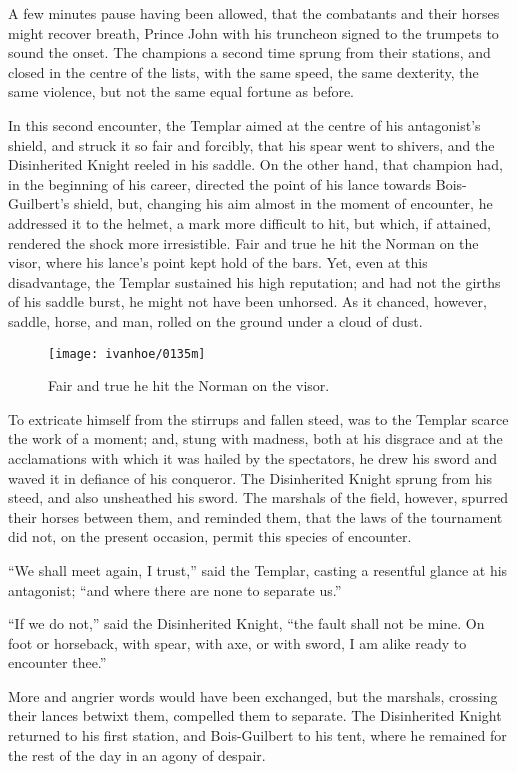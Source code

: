 A few minutes pause having been allowed, that the combatants and their
horses might recover breath, Prince John with his truncheon signed to
the trumpets to sound the onset. The champions a second time sprung from
their stations, and closed in the centre of the lists, with the same
speed, the same dexterity, the same violence, but not the same equal
fortune as before.

In this second encounter, the Templar aimed at the centre of his
antagonist's shield, and struck it so fair and forcibly, that his spear
went to shivers, and the Disinherited Knight reeled in his saddle. On
the other hand, that champion had, in the beginning of his career,
directed the point of his lance towards Bois-Guilbert's shield, but,
changing his aim almost in the moment of encounter, he addressed it to
the helmet, a mark more difficult to hit, but which, if attained,
rendered the shock more irresistible. Fair and true he hit the Norman on
the visor, where his lance's point kept hold of the bars. Yet, even at
this disadvantage, the Templar sustained his high reputation; and had
not the girths of his saddle burst, he might not have been unhorsed. As
it chanced, however, saddle, horse, and man, rolled on the ground under
a cloud of dust.

\begin{figure}
    \centering
    \texttt{[image: ivanhoe/0135m]}
    \caption{Fair and true he hit the Norman on the visor.}
\end{figure}

To extricate himself from the stirrups and fallen steed, was to the
Templar scarce the work of a moment; and, stung with madness, both at
his disgrace and at the acclamations with which it was hailed by the
spectators, he drew his sword and waved it in defiance of his conqueror.
The Disinherited Knight sprung from his steed, and also unsheathed his
sword. The marshals of the field, however, spurred their horses between
them, and reminded them, that the laws of the tournament did not, on the
present occasion, permit this species of encounter.

``We shall meet again, I trust,'' said the Templar, casting a resentful
glance at his antagonist; ``and where there are none to separate us.''

``If we do not,'' said the Disinherited Knight, ``the fault shall not be
mine. On foot or horseback, with spear, with axe, or with sword, I am
alike ready to encounter thee.''

More and angrier words would have been exchanged, but the marshals,
crossing their lances betwixt them, compelled them to separate. The
Disinherited Knight returned to his first station, and Bois-Guilbert to
his tent, where he remained for the rest of the day in an agony of
despair.

